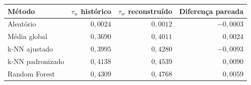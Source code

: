 \begin{tabular}{lrrr}
\toprule
Método & $\tau_w$ histórico & $\tau_w$ reconstruído & Diferença pareada \\
\midrule
Aleatório & $0{,}0024$ & $0{,}0012$ & $-0{,}0003$ \\
Média global & $0{,}3690$ & $0{,}4011$ & $0{,}0024$ \\
k-NN ajustado & $0{,}3995$ & $0{,}4280$ & $-0{,}0093$ \\
k-NN padronizado & $0{,}4138$ & $0{,}4539$ & $0{,}0090$ \\
Random Forest & $0{,}4309$ & $0{,}4768$ & $0{,}0059$ \\
\bottomrule
\end{tabular}